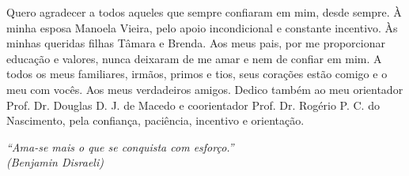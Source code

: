 \documentclass[
	12pt,				%
	oneside,			%
	a4paper,			%
	english,			%
	brazil				%
	]{abntex2ppgsi}
\begin{document}
%
% 
%
\begin{agradecimentos}
Quero agradecer a todos aqueles que sempre confiaram em mim, desde sempre.
À minha esposa Manoela Vieira, pelo apoio incondicional e constante incentivo. Às minhas queridas filhas Tâmara e Brenda. Aos meus pais, por me proporcionar educação e valores, nunca deixaram de me amar e nem de confiar em mim. A todos os meus familiares, irmãos, primos e tios, seus corações estão comigo e o meu com vocês. Aos meus verdadeiros amigos. Dedico também ao meu orientador Prof. Dr. Douglas D. J. de Macedo e coorientador  Prof. Dr. Rogério P. C. do Nascimento, pela confiança, paciência, incentivo e orientação. 
\end{agradecimentos}

%
% 
\begin{epigrafe}
    \vspace*{\fill}
	\begin{flushright}
		\textit{``Ama-se mais o que se conquista com esforço.''\\
		(Benjamin Disraeli)}
	\end{flushright}
\end{epigrafe}

\end{document}
